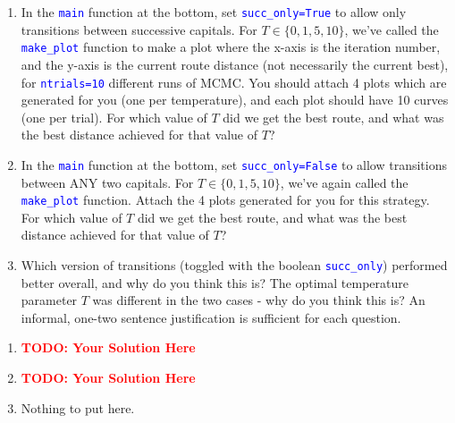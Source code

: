 \documentclass[12pt]{article}
\def\code#1{\textcolor{blue}{\texttt{#1}}}
\def\todo#1{\textcolor{red}{\textbf{#1}}}
\renewcommand{\|}{\mid}
\begin{document}
\begin{enumerate}
\begin{enumerate}
    \item In the \code{main} function at the bottom, set \code{succ\_only=True} to allow only transitions between successive capitals. For $T\in\{0,1,5,10\}$, we've called the \code{make\_plot} function to make a plot where the x-axis is the iteration number, and the y-axis is the current route distance (not necessarily the current best), for \code{ntrials=10} different runs of MCMC. You should attach 4 plots which are generated for you (one per temperature), and each plot should have 10 curves (one per trial). For which value of $T$ did we get the best route, and what was the best distance achieved for that value of $T$?
    \item In the \code{main} function at the bottom, set \code{succ\_only=False} to allow transitions between ANY two capitals. For $T\in\{0,1,5,10\}$, we've again called the \code{make\_plot} function. Attach the 4 plots generated for you for this strategy. For which value of $T$ did we get the best route, and what was the best distance achieved for that value of $T$?
    \item Which version of transitions (toggled with the boolean \code{succ\_only}) performed better overall, and why do you think this is? The optimal temperature parameter $T$ was different in the two cases - why do you think this is?  An informal, one-two sentence justification is sufficient for each question.
\end{enumerate}

\begin{tcolorbox}
\begin{enumerate}
\item \todo{TODO: Your Solution Here}
\item \todo{TODO: Your Solution Here}
\item Nothing to put here.


\end{enumerate}
\end{tcolorbox}
\end{enumerate}
\end{document}
